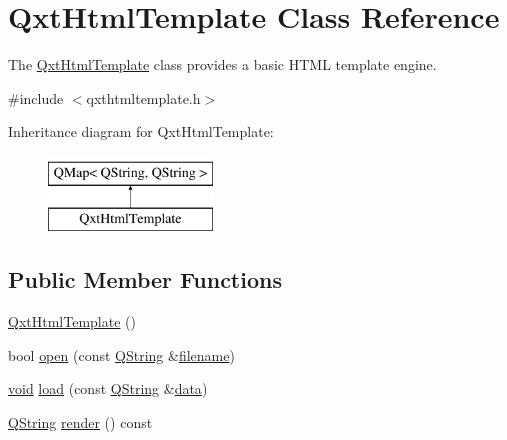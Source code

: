 \hypertarget{class_qxt_html_template}{\section{Qxt\-Html\-Template Class Reference}
\label{class_qxt_html_template}
}


The \hyperlink{class_qxt_html_template}{Qxt\-Html\-Template} class provides a basic H\-T\-M\-L template engine.  




{\ttfamily \#include $<$qxthtmltemplate.\-h$>$}

Inheritance diagram for Qxt\-Html\-Template\-:\begin{figure}[H]
\begin{center}
\leavevmode
\includegraphics[height=2.000000cm]{class_qxt_html_template}
\end{center}
\end{figure}
\subsection*{Public Member Functions}
\begin{DoxyCompactItemize}
\item 
\hyperlink{class_qxt_html_template_a6b01fa4dfc80b41c443c9f5d57772503}{Qxt\-Html\-Template} ()
\item 
bool \hyperlink{class_qxt_html_template_a2021a270d66b4a390aa15d4bf94955ce}{open} (const \hyperlink{group___u_a_v_objects_plugin_gab9d252f49c333c94a72f97ce3105a32d}{Q\-String} \&\hyperlink{ioapi_8h_a7a03a664b090ce5c848ecb31cb4a2fa8}{filename})
\item 
\hyperlink{group___u_a_v_objects_plugin_ga444cf2ff3f0ecbe028adce838d373f5c}{void} \hyperlink{class_qxt_html_template_a4313905469efe6fb46a238da6df1a774}{load} (const \hyperlink{group___u_a_v_objects_plugin_gab9d252f49c333c94a72f97ce3105a32d}{Q\-String} \&\hyperlink{glext_8h_a8850df0785e6fbcc2351af3b686b8c7a}{data})
\item 
\hyperlink{group___u_a_v_objects_plugin_gab9d252f49c333c94a72f97ce3105a32d}{Q\-String} \hyperlink{class_qxt_html_template_a1deb4b005644aea13e001713335606b3}{render} () const 
\end{DoxyCompactItemize}


